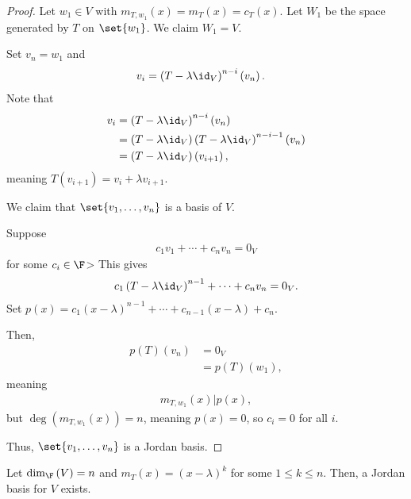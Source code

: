 \documentclass[10pt]{mypackage}
\begin{document}
\begin{proof}
  Let $w_1\in V$ with $m_{T,w_1}(x) = m_{T}(x) = c_T(x)$. Let $W_1$ be the space generated by $T$ on $\set{w_1}$. We claim $W_1 = V$.\newline

  Set $v_n = w_1$ and
  \begin{align*}
    v_i &= \left(T-\lambda\id_V\right)^{n-i}\left(v_n\right).
  \end{align*}
  Note that
  \begin{align*}
    v_i &= \left(T-\lambda\id_V\right)^{n-i}\left(v_n\right)\\
        &= \left(T-\lambda\id_V\right)\left(T-\lambda\id_V\right)^{n-i-1}\left(v_n\right)\\
        &= \left(T-\lambda\id_V\right)\left(v_{i+1}\right),
  \end{align*}
  meaning $T\left(v_{i+1}\right) = v_i + \lambda v_{i+1}$.\newline

  We claim that $\set{v_1,\dots,v_n}$ is a basis of $V$.\newline

  Suppose
  \begin{align*}
    c_1 v_1 + \cdots + c_nv_n = 0_V
  \end{align*}
  for some $c_i\in \F$> This gives
  \begin{align*}
    c_1\left(T-\lambda\id_V\right)^{n-1} + \cdots + c_{n}v_n = 0_V.
  \end{align*}
  Set $p(x) = c_1(x-\lambda)^{n-1} + \cdots + c_{n-1}\left(x-\lambda\right) + c_n$.\newline

  Then,
  \begin{align*}
    p(T)\left(v_n\right) &= 0_V\\
                         &= p(T)\left(w_1\right),
  \end{align*}
  meaning
  \begin{align*}
    m_{T,w_1}\left(x\right)|p(x),
  \end{align*}
  but $\deg\left(m_{T,w_1}(x)\right) = n$, meaning $p(x) = 0$, so $c_i = 0$ for all $i$.\newline

  Thus, $\set{v_1,\dots,v_n}$ is a Jordan basis.
\end{proof}
\begin{proposition}
  Let $\dim_{\F}\left(V\right) = n$ and $m_T(x) = \left(x-\lambda\right)^k$ for some $1\leq k \leq n$. Then, a Jordan basis for $V$ exists.
\end{proposition}
\end{document}
